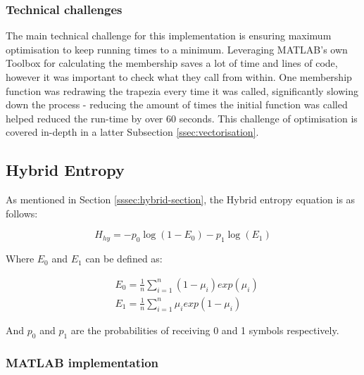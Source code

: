 \subsubsection{Technical challenges}

The main technical challenge for this implementation is ensuring maximum optimisation to keep running times to a minimum. Leveraging MATLAB's own Toolbox for calculating the membership saves a lot of time and lines of code, however it was important to check what they call from within. One membership function was redrawing the trapezia every time it was called, significantly slowing down the process - reducing the amount of times the initial function was called helped reduced the run-time by over 60 seconds. This challenge of optimisation is covered in-depth in a latter Subsection \ref{ssec:vectorisation}.

\newpage
\subsection{Hybrid Entropy}
\label{ssec:hybrid-sec}

As mentioned in Section \ref{sssec:hybrid-section}, the Hybrid entropy equation is as follows:

\begin{equation}
  H_{hy} = -p_0\log(1 - E_0) - p_1\log(E_1)
\end{equation}

Where $E_0$ and $E_1$ can be defined as:

\begin{subequations} %
  \begin{align}
    &E_0 = \frac{1}{n}\displaystyle\sum_{i=1}^{n}{(1-\mu_i)exp(\mu_i)} \\
    &E_1 = \frac{1}{n}\displaystyle\sum_{i=1}^{n}{\mu_iexp(1-\mu_i)}
  \end{align}
\end{subequations}

And $p_0$ and $p_1$ are the probabilities of receiving 0 and 1 symbols respectively.

\subsubsection{MATLAB implementation}

